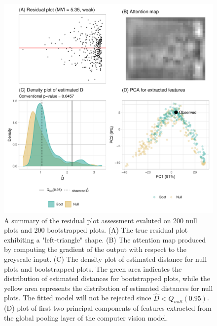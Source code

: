 \documentclass[]{interact}
\theoremstyle{plain}%
\theoremstyle{definition}
\theoremstyle{remark}
\begin{document}
\begin{figure}[!h]

{\centering \includegraphics[width=1\linewidth]{paper_files/figure-latex/false-check-1} 

}

\caption{A summary of the residual plot assessment evaluted on 200 null plots and 200 bootstrapped plots. (A) The true residual plot exhibiting a "left-triangle" shape. (B) The attention map produced by computing the gradient of the output with respect to the greyscale input.  (C) The density plot of estimated distance for null plots and bootstrapped plots. The green area indicates the distribution of estimated distances for bootstrapped plots, while the yellow area represents the distribution of estimated distances for null plots. The fitted model will not be rejected since $\hat{D} < Q_{null}(0.95)$. (D) plot of first two principal components of features extracted from the global pooling layer of the computer vision model.  }\label{fig:false-check}
\end{figure}
\end{document}

